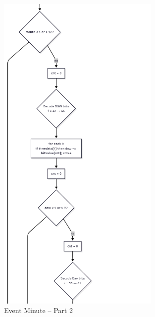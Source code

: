 \documentclass[a4paper,12pt]{article}
\begin{document}
\begin{figure}[H]
    \centering
    \includegraphics[width=0.7\textwidth]{diagrams/eventMinute/eventMinute2.png}
    \caption{Event Minute – Part 2}
    \label{fig:eventMinute2}
\end{figure}
\end{document}
